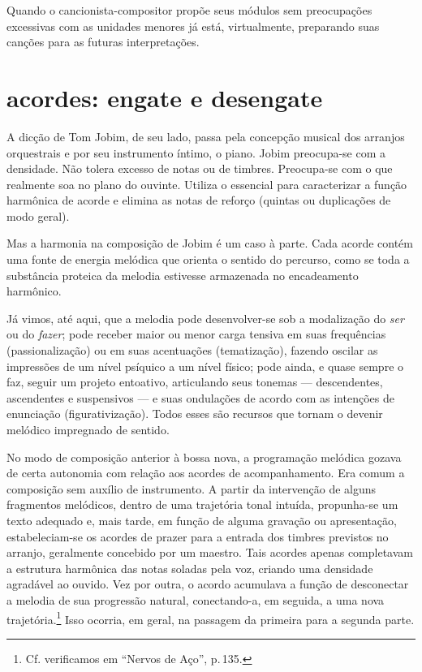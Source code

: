 Quando o cancionista-compositor propõe seus módulos sem preocupações
excessivas com as unidades menores já está, virtualmente, preparando
suas canções para as futuras interpretações.

\section{acordes: engate e desengate}

A dicção de Tom Jobim, de seu lado, passa pela concepção musical dos
arranjos orquestrais e por seu instrumento íntimo, o piano. Jobim
preocupa-se com a densidade. Não tolera excesso de notas ou de timbres.
Preocupa-se com o que realmente soa no plano do ouvinte. Utiliza o
essencial para caracterizar a função harmônica de acorde e elimina as
notas de reforço (quintas ou duplicações de modo geral).

Mas a harmonia na composição de Jobim é um caso à parte. Cada acorde
contém uma fonte de energia melódica que orienta o sentido do percurso,
como se toda a substância proteica da melodia estivesse armazenada no
encadeamento harmônico.

Já vimos, até aqui, que a melodia pode desenvolver-se sob a modalização
do \textit{ser} ou do \textit{fazer}; pode receber maior ou menor carga tensiva em suas
frequências (passionalização) ou em suas acentuações (tematização),
fazendo oscilar as impressões de um nível psíquico a um nível físico;
pode ainda, e quase sempre o faz, seguir um projeto entoativo,
articulando seus tonemas --- descendentes, ascendentes e suspensivos --- e
suas ondulações de acordo com as intenções de enunciação
(figurativização). Todos esses são recursos que tornam o devenir
melódico impregnado de sentido.

No modo de composição anterior à bossa nova, a programação melódica
gozava de certa autonomia com relação aos acordes de acompanhamento. Era
comum a composição sem auxílio de instrumento. A partir da intervenção
de alguns fragmentos melódicos, dentro de uma trajetória tonal intuída,
propunha-se um texto adequado e, mais tarde, em função de alguma
gravação ou apresentação, estabeleciam-se os acordes de prazer para a
entrada dos timbres previstos no arranjo, geralmente concebido por um
maestro. Tais acordes apenas completavam a estrutura harmônica das
notas soladas pela voz, criando uma densidade agradável ao ouvido. Vez
por outra, o acordo acumulava a função de desconectar a melodia de sua
progressão natural, conectando-a, em seguida, a uma nova trajetória.\footnote{Cf. verificamos em ``Nervos de Aço'', 
p.\,135.} Isso ocorria, em geral,
na passagem da primeira para a segunda parte.

